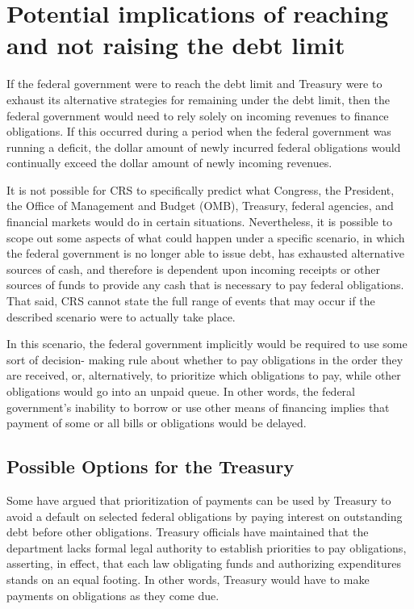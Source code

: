 \section{Potential implications of reaching and not raising the debt limit}
\label{sec:Implications}

If the federal government were to reach the debt limit and Treasury were to exhaust its alternative strategies for remaining under the debt limit, then the federal government would need to rely solely on incoming revenues to finance obligations. If this occurred during a period when the federal government was running a deficit, the dollar amount of newly incurred federal obligations would continually exceed the dollar amount of newly incoming revenues.

It is not possible for CRS to specifically predict what Congress, the President, the Office of Management and Budget (OMB), Treasury, federal agencies, and financial markets would do in certain situations. Nevertheless, it is possible to scope out some aspects of what could happen under a specific scenario, in which the federal government is no longer able to issue debt, has exhausted alternative sources of cash, and therefore is dependent upon incoming receipts or other sources of funds to provide any cash that is necessary to pay federal obligations. That said, CRS cannot state the full range of events that may occur if the described scenario were to actually take place.

In this scenario, the federal government implicitly would be required to use some sort of decision- making rule about whether to pay obligations in the order they are received, or, alternatively, to prioritize which obligations to pay, while other obligations would go into an unpaid queue. In other words, the federal government’s inability to borrow or use other means of financing implies that payment of some or all bills or obligations would be delayed.

\subsection{Possible Options for the Treasury}
Some have argued that prioritization of payments can be used by Treasury to avoid a default on selected federal obligations by paying interest on outstanding debt before other obligations. Treasury officials have maintained that the department lacks formal legal authority to establish priorities to pay obligations, asserting, in effect, that each law obligating funds and authorizing expenditures stands on an equal footing. In other words, Treasury would have to make payments on obligations as they come due.

